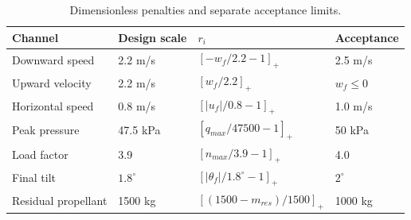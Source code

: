 \begin{table}[htbp]
\centering\small
\caption{Dimensionless penalties and separate acceptance limits.}
\label{tab:penalty}
\begin{tabularx}{\linewidth}{@{}lXlX@{}}
\toprule
Channel & Design scale & $r_i$ & Acceptance \\
\midrule
Downward speed & 2.2 m/s & $[-w_f/2.2-1]_+$ & 2.5 m/s \\
Upward velocity & 2.2 m/s & $[w_f/2.2]_+$ & $w_f\le0$ \\
Horizontal speed & 0.8 m/s & $[|u_f|/0.8-1]_+$ & 1.0 m/s \\
Peak pressure & 47.5 kPa & $[q_{max}/47500-1]_+$ & 50 kPa \\
Load factor & 3.9 & $[n_{max}/3.9-1]_+$ & 4.0 \\
Final tilt & $1.8^\circ$ & $[|\theta_f|/1.8^\circ-1]_+$ & $2^\circ$ \\
Residual propellant & 1500 kg & $[(1500-m_{res})/1500]_+$ & 1000 kg \\
\bottomrule
\end{tabularx}
\par{}
\end{table}
